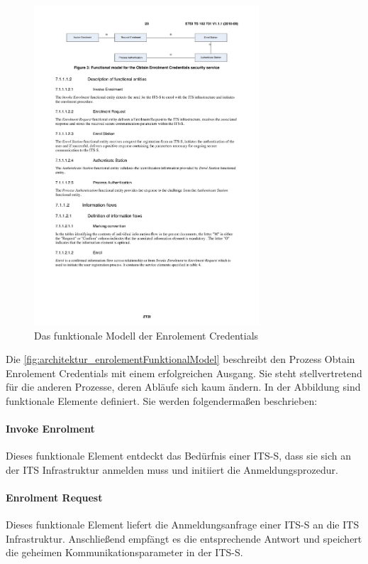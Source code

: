 \begin{figure}[h]
	\includegraphics[width=0.75\textwidth]{content/images/02_architektur/enrolementFunktionaleKomponenten.pdf}
	\caption{Das funktionale Modell der Enrolement Credentials \cite{ts102731}}
	\label{fig:architektur_enrolementFunktionalModel}
\end{figure}

Die \autoref{fig:architektur_enrolementFunktionalModel} beschreibt den Prozess Obtain Enrolement Credentials mit einem erfolgreichen Ausgang. Sie steht stellvertretend für die anderen Prozesse, deren Abläufe sich kaum ändern. In der Abbildung sind funktionale Elemente definiert. Sie werden folgendermaßen beschrieben:
\paragraph{Invoke Enrolment} Dieses funktionale Element entdeckt das Bedürfnis einer \ac{ITS-S}, dass sie sich an der \ac{ITS} Infrastruktur anmelden muss und initiiert die Anmeldungsprozedur.

\paragraph{Enrolment Request} Dieses funktionale Element liefert die Anmeldungsanfrage einer \ac{ITS-S} an die \ac{ITS} Infrastruktur. Anschließend empfängt es die entsprechende Antwort und speichert die geheimen Kommunikationsparameter in der \ac{ITS-S}.


